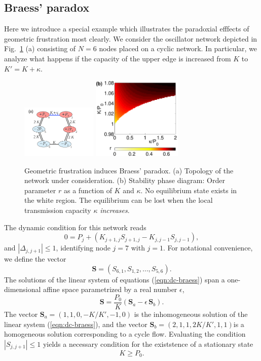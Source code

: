 \documentclass[10pt,aps,pra,onecolumn,superscriptaddress]{revtex4-1}
\newcommand{\be}{\begin{equation}}
\newcommand{\ee}{\end{equation}}
\renewcommand{\vec}[1]{\boldsymbol{#1}}
\begin{document}
\subsection{Braess' paradox}
\label{sec:braess}

Here we introduce a special example which illustrates the
paradoxial efffects of geometric frustration most clearly.
We consider the oscillator network depicted in Fig.~\ref{fig:braess} (a)
consisting of $N=6$ nodes placed on a cyclic network.
In particular, we analyze what happens if the capacity
of the upper edge is increased from $K$ to 
$K' = K + \kappa$. 


\begin{figure}[tb]
\centering
\includegraphics[width =3.6cm, angle=0]{pics/cycleex1_a}
\includegraphics[width=4.3cm, angle=0]{pics/braess_order3}
\caption{\label{fig:braess}
Geometric frustration induces Braess' paradox.
(a) Topology of the network under consideration.
(b) Stability phase diagram: Order parameter $r$ 
as a function of $K$ and $\kappa$. No equilibrium 
state exists in the white region. 
The equilibrium can be lost when the
local transmission capacity $\kappa$ 
\emph{increases}.
}
\end{figure}

The dynamic condition for this network reads
\be
   0 = P_j + ( K_{j+1,j} S_{j+1,j}  - K_{j,j-1} S_{j,j-1} ),
   \label{eqn:dc-braess}
\ee
and $|\Delta_{j,j+1}| \le 1$, identifying node $j=7$ with $j=1$.
 For notational convenience,
we define the vector 
\be
   \vec S = (S_{6,1} ,S_{1,2}, \ldots, S_{5,6} ).
\ee
The solutions of the linear system of equations (\ref{eqn:dc-braess}) 
span a one-dimensional affine space parametrized by a real 
number $\epsilon$,
\be
   \vec S = \frac{P_0}{K} 
      \left( \vec S_a - \epsilon \, \vec S_b \right).
   \label{eqn:SaSb2}
\ee
The vector $\vec S_a = (1,1,0,-K/K',-1, 0)$ is the 
inhomogeneous solution of the linear system (\ref{eqn:dc-braess}), 
and the vector $\vec S_b = (2,1,1,2K/K',1,1)$is a homogeneous 
solution corresponding to a cycle flow.
Evaluating the condition $|S_{j,j+1}| \le 1$ yields
a necessary condition for the existstence of a stationary state
\be
     K \ge P_0.
\ee
\end{document}
